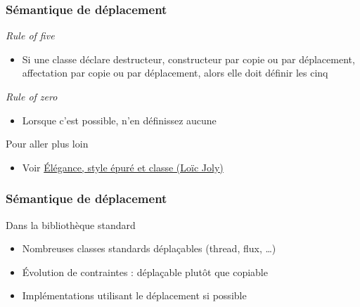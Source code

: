 \documentclass[C++.tex]{subfiles}
\begin{document}
\begin{frame}
	\frametitle{Sémantique de déplacement}
	\begin{block}{\textit{Rule of five}}
		\begin{itemize}
			\item Si une classe déclare destructeur, constructeur par copie ou par déplacement, affectation par copie ou par déplacement, alors elle doit définir les cinq

		\end{itemize}
	\end{block}

	\begin{block}{\textit{Rule of zero}}
		\begin{itemize}
			\item Lorsque c'est possible, n'en définissez aucune

		\end{itemize}
	\end{block}

	\begin{block}{Pour aller plus loin}
		\begin{itemize}
			\item Voir \href{https://github.com/cppp-france/CPPP-19/blob/master/elegance_style_epure_et_classe-Loic_Joly/elegance_style_epure_et_classe-Loic_Joly.pdf}{Élégance, style épuré et classe (Loïc Joly)}
		\end{itemize}
	\end{block}
\end{frame}

\begin{frame}
	\frametitle{Sémantique de déplacement}
	\begin{block}{Dans la bibliothèque standard}
		\begin{itemize}
			\item Nombreuses classes standards déplaçables (thread, flux, \ldots{})


			\item Évolution de contraintes : déplaçable plutôt que copiable


			\item Implémentations utilisant le déplacement si possible
		\end{itemize}
	\end{block}
\end{frame}
\end{document}
